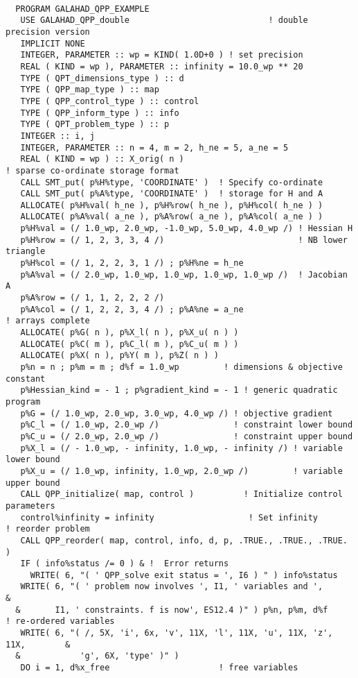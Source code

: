 \documentclass{galahad}
\begin{document}
{\tt \small
\begin{verbatim}
  PROGRAM GALAHAD_QPP_EXAMPLE
   USE GALAHAD_QPP_double                            ! double precision version
   IMPLICIT NONE
   INTEGER, PARAMETER :: wp = KIND( 1.0D+0 ) ! set precision
   REAL ( KIND = wp ), PARAMETER :: infinity = 10.0_wp ** 20
   TYPE ( QPT_dimensions_type ) :: d
   TYPE ( QPP_map_type ) :: map
   TYPE ( QPP_control_type ) :: control
   TYPE ( QPP_inform_type ) :: info
   TYPE ( QPT_problem_type ) :: p
   INTEGER :: i, j
   INTEGER, PARAMETER :: n = 4, m = 2, h_ne = 5, a_ne = 5
   REAL ( KIND = wp ) :: X_orig( n )
! sparse co-ordinate storage format
   CALL SMT_put( p%H%type, 'COORDINATE' )  ! Specify co-ordinate
   CALL SMT_put( p%A%type, 'COORDINATE' )  ! storage for H and A
   ALLOCATE( p%H%val( h_ne ), p%H%row( h_ne ), p%H%col( h_ne ) )
   ALLOCATE( p%A%val( a_ne ), p%A%row( a_ne ), p%A%col( a_ne ) )
   p%H%val = (/ 1.0_wp, 2.0_wp, -1.0_wp, 5.0_wp, 4.0_wp /) ! Hessian H
   p%H%row = (/ 1, 2, 3, 3, 4 /)                           ! NB lower triangle
   p%H%col = (/ 1, 2, 2, 3, 1 /) ; p%H%ne = h_ne
   p%A%val = (/ 2.0_wp, 1.0_wp, 1.0_wp, 1.0_wp, 1.0_wp /)  ! Jacobian A
   p%A%row = (/ 1, 1, 2, 2, 2 /)
   p%A%col = (/ 1, 2, 2, 3, 4 /) ; p%A%ne = a_ne
! arrays complete
   ALLOCATE( p%G( n ), p%X_l( n ), p%X_u( n ) )
   ALLOCATE( p%C( m ), p%C_l( m ), p%C_u( m ) )
   ALLOCATE( p%X( n ), p%Y( m ), p%Z( n ) )
   p%n = n ; p%m = m ; d%f = 1.0_wp         ! dimensions & objective constant
   p%Hessian_kind = - 1 ; p%gradient_kind = - 1 ! generic quadratic program
   p%G = (/ 1.0_wp, 2.0_wp, 3.0_wp, 4.0_wp /) ! objective gradient
   p%C_l = (/ 1.0_wp, 2.0_wp /)               ! constraint lower bound
   p%C_u = (/ 2.0_wp, 2.0_wp /)               ! constraint upper bound
   p%X_l = (/ - 1.0_wp, - infinity, 1.0_wp, - infinity /) ! variable lower bound
   p%X_u = (/ 1.0_wp, infinity, 1.0_wp, 2.0_wp /)         ! variable upper bound
   CALL QPP_initialize( map, control )          ! Initialize control parameters
   control%infinity = infinity                   ! Set infinity
! reorder problem
   CALL QPP_reorder( map, control, info, d, p, .TRUE., .TRUE., .TRUE. )
   IF ( info%status /= 0 ) & !  Error returns
     WRITE( 6, "( ' QPP_solve exit status = ', I6 ) " ) info%status
   WRITE( 6, "( ' problem now involves ', I1, ' variables and ',               &
  &       I1, ' constraints. f is now', ES12.4 )" ) p%n, p%m, d%f
! re-ordered variables
   WRITE( 6, "( /, 5X, 'i', 6x, 'v', 11X, 'l', 11X, 'u', 11X, 'z', 11X,        &
  &            'g', 6X, 'type' )" )
   DO i = 1, d%x_free                      ! free variables

\end{verbatim}}
\end{document}
